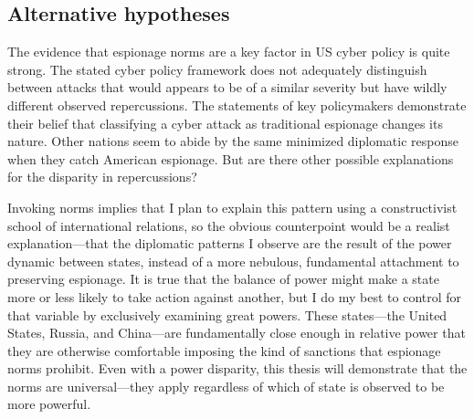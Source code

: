\documentclass{memoir}
\begin{document}
\begin{refsegment}


\subsection{Alternative hypotheses}
The evidence that espionage norms are a key factor in US cyber policy is quite strong. The stated cyber policy framework does not adequately distinguish between attacks that would appears to be of a similar severity but have wildly different observed repercussions. The statements of key policymakers demonstrate their belief that classifying a cyber attack as traditional espionage changes its nature. Other nations seem to abide by the same minimized diplomatic response when they catch American espionage. But are there other possible explanations for the disparity in repercussions?

Invoking norms implies that I plan to explain this pattern using a constructivist school of international relations, so the obvious counterpoint would be a realist explanation---that the diplomatic patterns I observe are the result of the power dynamic between states, instead of a more nebulous, fundamental attachment to preserving espionage. It is true that the balance of power might make a state more or less likely to take action against another, but I do my best to control for that variable by exclusively examining great powers. These states---the United States, Russia, and China---are fundamentally close enough in relative power that they are otherwise comfortable imposing the kind of sanctions that espionage norms prohibit. Even with a power disparity, this thesis will demonstrate that the norms are universal---they apply regardless of which of state is observed to be more powerful.


\end{refsegment}
\end{document}
